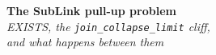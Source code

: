 \documentclass{beamer}
\begin{document}
{
\begin{frame}[plain]
\vspace*{\fill}
\begin{center}
{\Huge\bfseries\color{pgblue!85!black} The SubLink pull-up problem}\\[10mm]
{\large\itshape EXISTS, the \texttt{join\_collapse\_limit} cliff,\\and what happens between them}
\end{center}
\vspace*{\fill}
\end{frame}
}

%
\end{document}
